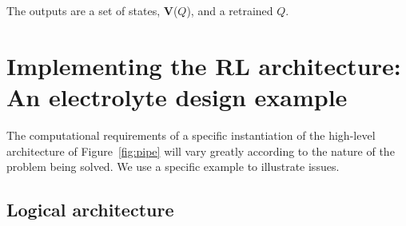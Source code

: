 \documentclass[10pt]{article}
\begin{document}
\noindent
The outputs are a set of states, \textbf{V}($Q$), and a retrained $Q$.


%
%
%
%
%
%



\section{Implementing the RL architecture: An electrolyte design example}

The computational requirements of a specific instantiation of the high-level architecture of Figure~\ref{fig:pipe} will vary greatly
according to the nature of the problem being solved.
We use a specific example to illustrate issues. 

\subsection{Logical architecture}
\end{document}
